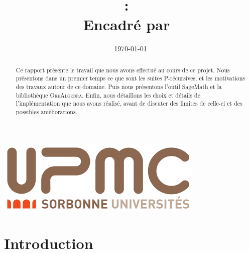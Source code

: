 \documentclass[12pt]{article}
\title{
\vspace{1in}
\textmd{\textbf{\hmwkClass:\ \hmwkTitle}}\\
\vspace{0.1in}\large{Encadré par\ \hmwkClassInstructor}
}
\author{\textbf{\hmwkAuthorName}}
\date{\today}
\begin{document}
\maketitle
\begin{abstract}
    Ce rapport présente le travail que nous avons effectué au cours de ce projet.
    Nous présentons dans un premier temps ce que sont les suites P-récursives, et les
    motivations des travaux autour de ce domaine.
    Puis nous présentons l'outil SageMath et la bibliothèque \textsc{OreAlgebra}.
    Enfin, nous détaillons les choix et détails de l'implémentation que nous avons réalisé,
    avant de discuter des limites de celle-ci et des possibles améliorations.
\end{abstract}
\vspace{1in}
\begin{center}
    \includegraphics[scale=0.7]{figures/upmc}
\end{center}


\setcounter{tocdepth}{2}

\newpage
\tableofcontents
\newpage



\section{Introduction}
\end{document}
